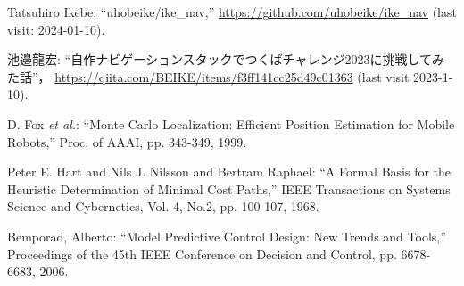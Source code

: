 \documentclass[twocolumn,9pt]{jsproceedings}
\begin{document}
\begin{thebibliography}{99}






  Tatsuhiro Ikebe: ``uhobeike/ike\_nav,'' \url{https://github.com/uhobeike/ike_nav} (last visit: 2024-01-10).

  池邉龍宏: ``自作ナビゲーションスタックでつくばチャレンジ2023に挑戦してみた話''，
  \url{https://qiita.com/BEIKE/items/f3ff141cc25d49c01363} (last visit 2023-1-10).


	  D. Fox {\it et al.}: ``Monte Carlo Localization: Efficient Position Estimation for Mobile Robots,''
  Proc. of AAAI, pp. 343-349, 1999.

  Peter E. Hart and Nils J. Nilsson and Bertram Raphael: ``A Formal Basis for the Heuristic Determination of Minimal Cost Paths,''
  IEEE Transactions on Systems Science and Cybernetics, Vol. 4, No.2, pp. 100-107, 1968.


  Bemporad, Alberto: ``Model Predictive Control Design: New Trends and Tools,''
  Proceedings of the 45th IEEE Conference on Decision and Control, pp. 6678-6683, 2006.


\end{thebibliography}
\end{document}
